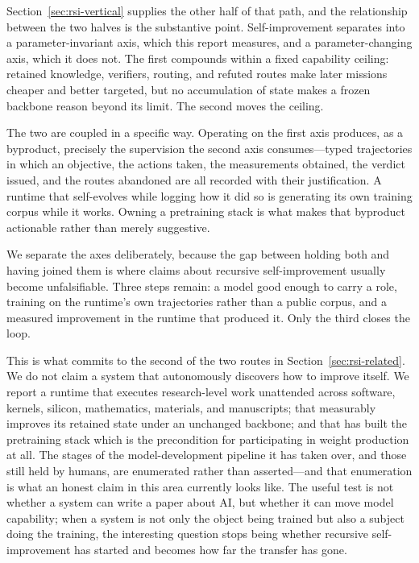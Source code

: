 Section~\ref{sec:rsi-vertical} supplies the other half of that path, and the
relationship between the two halves is the substantive point. Self-improvement
separates into a parameter-invariant axis, which this report measures, and a
parameter-changing axis, which it does not. The first compounds within a fixed
capability ceiling: retained knowledge, verifiers, routing, and refuted routes make
later missions cheaper and better targeted, but no accumulation of state makes a
frozen backbone reason beyond its limit. The second moves the ceiling.

The two are coupled in a specific way. Operating on the first axis produces, as a
byproduct, precisely the supervision the second axis consumes---typed trajectories
in which an objective, the actions taken, the measurements obtained, the verdict
issued, and the routes abandoned are all recorded with their justification. A
runtime that self-evolves while logging how it did so is generating its own training
corpus while it works. Owning a pretraining stack is what makes that byproduct
actionable rather than merely suggestive.

We separate the axes deliberately, because the gap between holding both and having
joined them is where claims about recursive self-improvement usually become
unfalsifiable. Three steps remain: a model good enough to carry a role, training on
the runtime's own trajectories rather than a public corpus, and a measured
improvement in the runtime that produced it. Only the third closes the loop.

This is what commits \systemname{} to the second of the two routes in
Section~\ref{sec:rsi-related}. We do not claim a system that autonomously discovers
how to improve itself. We report a runtime that executes research-level work
unattended across software, kernels, silicon, mathematics, materials, and
manuscripts; that measurably improves its retained state under an unchanged backbone;
and that has built the pretraining stack which is the precondition for participating
in weight production at all. The stages of the model-development pipeline it has
taken over, and those still held by humans, are enumerated rather than asserted---and
that enumeration is what an honest claim in this area currently looks like.
The useful test is not whether a system can write a paper about AI, but whether it
can move model capability; when a system is not only the object being trained but
also a subject doing the training, the interesting question stops being whether
recursive self-improvement has started and becomes how far the transfer has gone.


